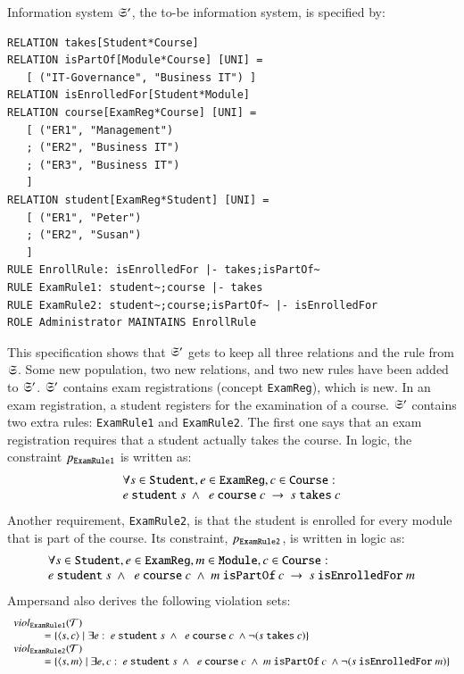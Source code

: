 \documentclass{elsarticle}
\begin{document}
	Information system $\mathfrak{S}'$, the to-be information system, is specified by:
\begin{verbatim}
RELATION takes[Student*Course]
RELATION isPartOf[Module*Course] [UNI] =
   [ ("IT-Governance", "Business IT") ]
RELATION isEnrolledFor[Student*Module]
RELATION course[ExamReg*Course] [UNI] =
   [ ("ER1", "Management")
   ; ("ER2", "Business IT")
   ; ("ER3", "Business IT")
   ]
RELATION student[ExamReg*Student] [UNI] =
   [ ("ER1", "Peter")
   ; ("ER2", "Susan")
   ]
RULE EnrollRule: isEnrolledFor |- takes;isPartOf~
RULE ExamRule1: student~;course |- takes
RULE ExamRule2: student~;course;isPartOf~ |- isEnrolledFor
ROLE Administrator MAINTAINS EnrollRule
\end{verbatim}
	This specification shows that $\mathfrak{S}'$ gets to keep all three relations and the rule from $\mathfrak{S}$.
	Some new population, two new relations, and two new rules have been added to $\mathfrak{S}'$.
	$\mathfrak{S}'$ contains exam registrations (concept \verb-ExamReg-), which is new.
	In an exam registration, a student registers for the examination of a course.
	$\mathfrak{S}'$ contains two extra rules: \verb-ExamRule1- and \verb-ExamRule2-.
	The first one says that an exam registration requires that a student actually takes the course.
	In logic, the constraint $p_{\tt ExamRule1}$ is written as:
\[\begin{array}{l}\forall s\in\text{\tt Student}, e\in\text{\tt ExamReg}, c\in\text{\tt Course}:\\
	e\ \text{\tt student}\ s\ \wedge\ \ e\ \text{\tt course}\ c\ \rightarrow\ s\ \text{\tt takes}\ c\\
\end{array}\]
	Another requirement, \verb-ExamRule2-, is that the student is enrolled for every module that is part of the course.
	Its constraint, $p_{\tt ExamRule2}$, is written in logic as:
\[\begin{array}{l}\forall s\in\text{\tt Student}, e\in\text{\tt ExamReg}, m\in\text{\tt Module}, c\in\text{\tt Course}:\\
	e\ \text{\tt student}\ s\ \wedge\ \ e\ \text{\tt course}\ c\ \wedge\ m\ \text{\tt isPartOf}\ c\ \rightarrow\ s\ \text{\tt isEnrolledFor}\ m
\end{array}\]
	Ampersand also derives the following violation sets:
\[\begin{array}{l}
	\viol{\text{\tt ExamRule1}}{\triples}\\
	\hspace{1cm}=\{\pair{s}{c}\mid\exists e:\ e\ \text{\tt student}\ s\ \wedge\ \ e\ \text{\tt course}\ c\ \wedge\neg(s\ \text{\tt takes}\ c)\}\\
	\viol{\text{\tt ExamRule2}}{\triples}\\
	\hspace{1cm}=\{\pair{s}{m}\mid\exists e,c:\ e\ \text{\tt student}\ s\ \wedge\ \ e\ \text{\tt course}\ c\ \wedge\ m\ \text{\tt isPartOf}\ c\ \wedge\neg(s\ \text{\tt isEnrolledFor}\ m)\}
\end{array}\]
\end{document}
